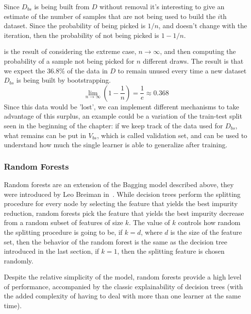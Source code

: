 \medskip

Since $D_{bs}$ is being built from $D$ without removal it's interesting to give an
estimate of the number of samples that are not being used to build the $i$th dataset. Since the
probability of being picked is $1 / n$, and doesn't change with the iteration, then the probability of not being picked is $1 - 1 / n$.

 is the result of considering the extreme case, $n \rightarrow \infty$, and
then computing the probability of a sample not being picked for $n$ different draws. The result is
that we expect the $36.8\%$ of the data in $D$ to remain unused every time a new dataset $D_{bs}$ is
being built by bootstrapping.
\begin{equation}
	\label{eq:bagging-limit}
	\lim_{n \rightarrow \infty} \left(1 - \frac{1}{n}\right) = \frac{1}{e} \approx 0.368
\end{equation}
Since this data would be 'lost', we can implement different mechanisms to take advantage of this
surplus, an example could be a variation of the train-test split seen in the beginning of the
chapter: if we keep track of the data used for $D_{bs}$, what remains can be put in $V_{bs}$,
which is called validation set, and can be used to understand how much the single learner is able to generalize after training.

\subsubsection{Random Forests}

Random forests are an extension of the Bagging model described above, they were introduced
by Leo Breiman in~\cite{Breiman2001}. While decision trees perform the splitting procedure for every
node by selecting the feature that yields the best impurity reduction, random forests pick the
feature that yields the best impurity decrease from a random subset of features of size $k$. The
value of $k$ controls how random the splitting procedure is going to be, if $k = d$, where $d$ is the size of the feature set, then the behavior of the random forest is the same as the decision tree introduced
in the last section, if $k = 1$, then the splitting feature is chosen randomly.

\medskip

Despite the relative simplicity of the model, random forests provide a high level of performance,
accompanied by the classic explainability of decision trees (with the added complexity of
having to deal with more than one learner at the same time).

